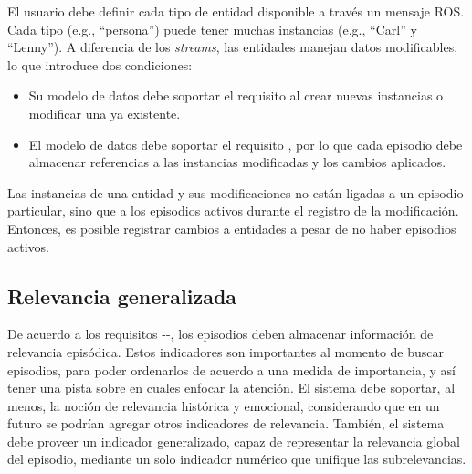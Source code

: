 El usuario debe definir cada tipo de entidad disponible a través un mensaje ROS. Cada tipo (e.g., ``persona'') puede tener muchas instancias (e.g., ``Carl'' y ``Lenny''). A diferencia de los \textit{streams}, las entidades manejan datos modificables, lo que introduce dos condiciones:
\begin{itemize}
\item Su modelo de datos debe soportar el requisito  al crear nuevas instancias o modificar una ya existente.
\item El modelo de datos debe soportar el requisito , por lo que cada episodio debe almacenar referencias a las instancias modificadas y los cambios aplicados.
\end{itemize}

Las instancias de una entidad y sus modificaciones no están ligadas a un episodio particular, sino que a los episodios activos durante el registro de la modificación. Entonces, es posible registrar cambios a entidades a pesar de no haber episodios activos.


\subsection{Relevancia generalizada}

De acuerdo a los requisitos --, los episodios deben almacenar información de relevancia episódica. Estos indicadores son importantes al momento de buscar episodios, para poder ordenarlos de acuerdo a una medida de importancia, y así tener una pista sobre en cuales enfocar la atención. El sistema debe soportar, al menos, la noción de relevancia histórica y emocional, considerando que en un futuro se podrían agregar otros indicadores de relevancia. También, el sistema debe proveer un indicador generalizado, capaz de representar la relevancia global del episodio, mediante un solo indicador numérico que unifique las subrelevancias.

